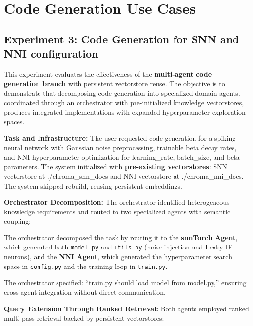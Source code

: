 \section{Code Generation Use Cases}

\subsection{Experiment 3: Code Generation for SNN and NNI configuration}

This experiment evaluates the effectiveness of the \textbf{multi-agent code generation branch} with persistent vectorstore reuse. The objective is to demonstrate that decomposing code generation into specialized domain agents, coordinated through an orchestrator with pre-initialized knowledge vectorstores, produces integrated implementations with expanded hyperparameter exploration spaces.

\vspace{0.3cm}

\noindent \textbf{Task and Infrastructure:} The user requested code generation for a spiking neural network with Gaussian noise preprocessing, trainable beta decay rates, and NNI hyperparameter optimization for learning\_rate, batch\_size, and beta parameters. The system initialized with \textbf{pre-existing vectorstores}: SNN vectorstore at ./chroma\_snn\_docs and NNI vectorstore at ./chroma\_nni\_docs. The system skipped rebuild, reusing persistent embeddings.

\vspace{0.3cm}

\noindent \textbf{Orchestrator Decomposition:} The orchestrator identified heterogeneous knowledge requirements and routed to two specialized agents with semantic coupling:

The orchestrator decomposed the task by routing it to the \textbf{snnTorch Agent}, which generated both \texttt{model.py} and \texttt{utils.py} (noise injection and Leaky IF neurons), and the \textbf{NNI Agent}, which generated the hyperparameter search space in \texttt{config.py} and the training loop in \texttt{train.py}.

The orchestrator specified: ``train.py should load model from model.py,'' ensuring cross-agent integration without direct communication.

\vspace{0.3cm}

\noindent \textbf{Query Extension Through Ranked Retrieval:} Both agents employed ranked multi-pass retrieval backed by persistent vectorstores:

